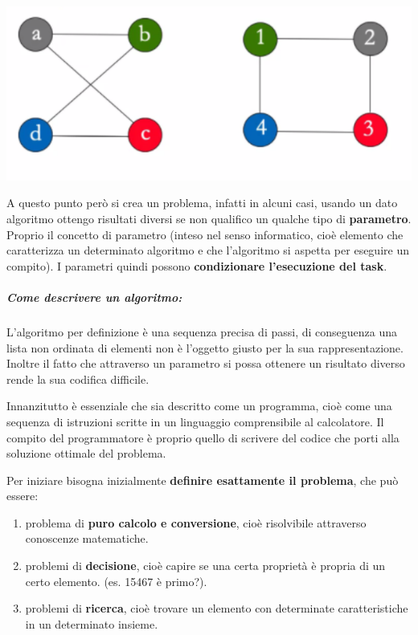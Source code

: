 \documentclass[
  paper=a4,
  oneside  ,captions=tableheading
]{scrbook}
\providecommand{\tightlist}{%
  \setlength{\itemsep}{0pt}\setlength{\parskip}{0pt}}
\begin{document}
\includegraphics{./image/image-20201110233258123.png}

A questo punto però si crea un problema, infatti in alcuni casi, usando
un dato algoritmo ottengo risultati diversi se non qualifico un qualche
tipo di \textbf{parametro}. Proprio il concetto di parametro (inteso nel
senso informatico, cioè elemento che caratterizza un determinato
algoritmo e che l'algoritmo si aspetta per eseguire un compito). I
parametri quindi possono \textbf{condizionare l'esecuzione del task}.

\hypertarget{come-descrivere-un-algoritmo}{%
\subparagraph{Come descrivere un
algoritmo:}\label{come-descrivere-un-algoritmo}}

L'algoritmo per definizione è una sequenza precisa di passi, di
conseguenza una lista non ordinata di elementi non è l'oggetto giusto
per la sua rappresentazione. Inoltre il fatto che attraverso un
parametro si possa ottenere un risultato diverso rende la sua codifica
difficile.

Innanzitutto è essenziale che sia descritto come un programma, cioè come
una sequenza di istruzioni scritte in un linguaggio comprensibile al
calcolatore. Il compito del programmatore è proprio quello di scrivere
del codice che porti alla soluzione ottimale del problema.

Per iniziare bisogna inizialmente \textbf{definire esattamente il
problema}, che può essere:

\begin{enumerate}
\def\labelenumi{\arabic{enumi}.}
\tightlist
\item
  problema di \textbf{puro calcolo e conversione}, cioè risolvibile
  attraverso conoscenze matematiche.
\item
  problemi di \textbf{decisione}, cioè capire se una certa proprietà è
  propria di un certo elemento. (es. 15467 è primo?).
\item
  problemi di \textbf{ricerca}, cioè trovare un elemento con determinate
  caratteristiche in un determinato insieme.
\end{enumerate}
\end{document}

